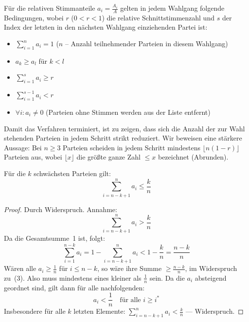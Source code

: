 Für die relativen Stimmanteile $a_i = \frac{A_i}{A}$ gelten in jedem Wahlgang folgende
Bedingungen, wobei $r$ ($0 < r < 1$) die relative Schnittstimmenzahl und $s$ der Index der
letzten in den nächsten Wahlgang einziehenden Partei ist:

\begin{itemize}[label={}]
  \item[(I)]   $\displaystyle\sum_{i=1}^{n} a_i = 1$
    \quad ($n$ -- Anzahl teilnehmender Parteien in diesem Wahlgang)
  \item[(II)]  $a_k \geq a_l$ \quad für $k < l$
  \item[(III)] $\displaystyle\sum_{i=1}^{s} a_i \geq r$
  \item[(IV)]  $\displaystyle\sum_{i=1}^{s-1} a_i < r$
  \item[\phantom{(IV)}] $\forall i: a_i \neq 0$ \quad
    (Parteien ohne Stimmen werden aus der Liste entfernt)
\end{itemize}

Damit das Verfahren terminiert, ist zu zeigen, dass sich die Anzahl der zur Wahl stehenden
Parteien in jedem Schritt strikt reduziert. Wir beweisen eine stärkere Aussage: Bei $n \geq 3$
Parteien scheiden in jedem Schritt mindestens $\lfloor n(1-r) \rfloor$ Parteien aus, wobei
$\lfloor x \rfloor$ die größte ganze Zahl $\leq x$ bezeichnet (Abrunden).

\begin{hilfssatz}
Für die $k$ schwächsten Parteien gilt:
\begin{equation}
  \sum_{i=n-k+1}^{n} a_i \leq \frac{k}{n}
\end{equation}
\end{hilfssatz}

\begin{proof}
  Durch Widerspruch. Annahme:
\begin{equation}
  \sum_{i=n-k+1}^{n} a_i > \frac{k}{n}
\end{equation}
Da die Gesamtsumme~1 ist, folgt:
\begin{equation}
  \sum_{i=1}^{n-k} a_i = 1 - \sum_{i=n-k+1}^{n} a_i < 1 - \frac{k}{n} = \frac{n-k}{n}
\end{equation}
Wären alle $a_i \geq \frac{1}{n}$ für $i \leq n-k$, so wäre ihre Summe $\geq \frac{n-k}{n}$,
im Widerspruch zu~(3). Also muss mindestens eines kleiner als $\frac{1}{n}$ sein. Da die
$a_i$ absteigend geordnet sind, gilt dann für alle nachfolgenden:
\begin{equation}
  a_i < \frac{1}{n} \quad \text{für alle } i \geq i^*
\end{equation}
Insbesondere für alle $k$ letzten Elemente: $\displaystyle\sum_{i=n-k+1}^{n} a_i < \frac{k}{n}$
--- Widerspruch.
\end{proof}

